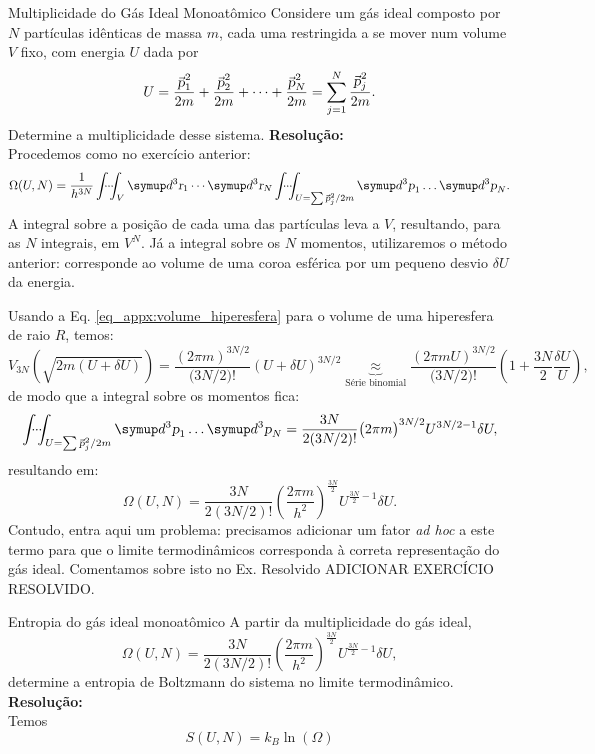     \begin{solved}{Multiplicidade do Gás Ideal Monoatômico}{}
        Considere um gás ideal composto por $N$ partículas idênticas de massa $m$, cada uma restringida a se mover num volume $V$ fixo, com energia $U$ dada por \[U=\frac{\vec{\p}^2_1}{2m}+\frac{\vec{\p}^2_2}{2m}+\cdots+\frac{\vec{\p}^2_N}{2m}=\sum_{j=1}^N\frac{\vec{\p}^2_j}{2m}.\] Determine a multiplicidade desse sistema.
        \tcblower
        \noindent\textbf{Resolução:}\\
        \indent Procedemos como no exercício anterior: \[\Omega(U,N)=\frac{1}{h^{3N}}\idotsint_V\diff^3\R_1\cdots\diff^3\R_N\idotsint_{U=\sum\vec{\p}^2_j/2m}\diff^3\p_1\dots\diff^3\p_N.\] A integral sobre a posição de cada uma das partículas leva a $V$, resultando, para as $N$ integrais, em $V^N$. Já a integral sobre os $N$ momentos, utilizaremos o método anterior: corresponde ao volume de uma coroa esférica por um pequeno desvio $\delta U$ da energia.

        Usando a Eq. \eqref{eq_appx:volume_hiperesfera} para o volume de uma hiperesfera de raio $R$, temos: \[V_{3N}(\sqrt{2m(U+\delta U)})=\frac{(2\pi m)^{3N/2}}{\big(3N/2\big)!}(U+\delta U)^{3N/2}\underbrace{\approx}_{\text{Série binomial}}\frac{(2\pi mU)^{3N/2}}{\big(3N/2\big)!}\left(1+\frac{3N}{2}\frac{\delta U}{U}\right),\]
        de modo que a integral sobre os momentos fica: \[\idotsint_{U=\sum\vec{\p}^2_j/2m}\diff^3\p_1\dots\diff^3\p_N = \frac{3N}{2(3N/2)!}\big(2\pi m\big)^{3N/2}U^{3N/2-1}\delta U,\] resultando em:
        \[\Omega(U,N)=\frac{3N}{2(3N/2)!}\left(\frac{2\pi m}{h^2}\right)^{\frac{3N}{2}}U^{\frac{3N}{2}-1}\delta U.\] Contudo, entra aqui um problema: precisamos adicionar um fator \textit{ad hoc} a este termo para que o limite termodinâmicos corresponda à correta representação do gás ideal. Comentamos sobre isto no Ex. Resolvido ADICIONAR EXERCÍCIO RESOLVIDO.
    \end{solved}

    \begin{solved}{Entropia do gás ideal monoatômico}{}
        A partir da multiplicidade do gás ideal, \[\Omega(U,N)=\frac{3N}{2(3N/2)!}\left(\frac{2\pi m}{h^2}\right)^{\frac{3N}{2}}U^{\frac{3N}{2}-1}\delta U,\] determine a entropia de Boltzmann do sistema no limite termodinâmico.
        \tcblower
        \noindent\textbf{Resolução:}\\
        \indent Temos \[S(U,N)=k_B\ln(\Omega)\]
    \end{solved}

\newpage
